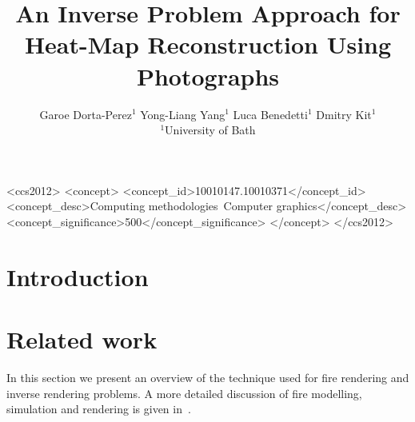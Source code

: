 \documentclass{acmsiggraph}
\title{An Inverse Problem Approach for Heat-Map Reconstruction Using Photographs}
\author{Garoe Dorta-Perez$^1$ \qquad Yong-Liang Yang$^1$ \qquad Luca Benedetti$^1$ \qquad Dmitry Kit$^1$ \\$^1$University of Bath}
\begin{document}


\maketitle

\begin{abstract}



\end{abstract}

%
%
\begin{CCSXML}
<ccs2012>
<concept>
<concept_id>10010147.10010371</concept_id>
<concept_desc>Computing methodologies~Computer graphics</concept_desc>
<concept_significance>500</concept_significance>
</concept>
</ccs2012>
\end{CCSXML}


%
%


\keywordlist

\conceptlist

\printcopyright

\section{Introduction}



\section{Related work}

In this section we present an overview of the technique used for fire rendering and inverse rendering problems.
A more detailed discussion of fire modelling, simulation and rendering is given in~\cite{Huang:2014}.
\end{document}
